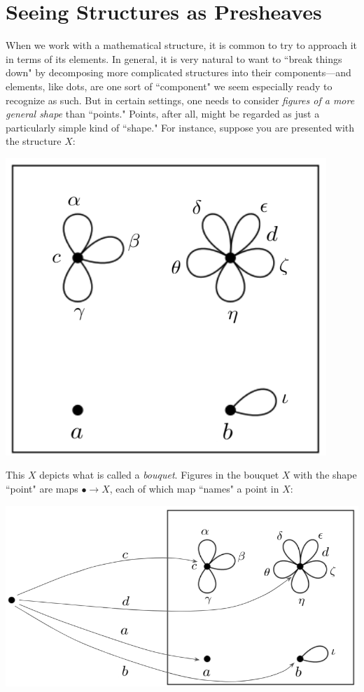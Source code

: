 \documentclass[11pt]{book}
\theoremstyle{definition}
\theoremstyle{definition}
\theoremstyle{definition}
\theoremstyle{theorem}
\theoremstyle{definition}
\begin{document}
\section{Seeing Structures as Presheaves}
When we work with a mathematical structure, it is common to try to approach it in terms of its elements. In general, it is very natural to want to ``break things down" by decomposing more complicated structures into their components---and elements, like dots, are one sort of ``component" we seem especially ready to recognize as such. But in certain settings, one needs to consider \textit{figures of a more general shape} than ``points." Points, after all, might be regarded as just a particularly simple kind of ``shape." For instance, suppose you are presented with the structure $X$: 
\begin{center}
	\includegraphics*[scale=0.25]{Bouquet2.png}
\end{center}
This $X$ depicts what is called a \textit{bouquet}. Figures in the bouquet $X$ with the shape ``point" are maps $\bullet \rightarrow X$, each of which map ``names" a point in $X$: 
\begin{center}
	\includegraphics*[scale=0.25]{BouquetPoints.png}
\end{center}
\end{document}
